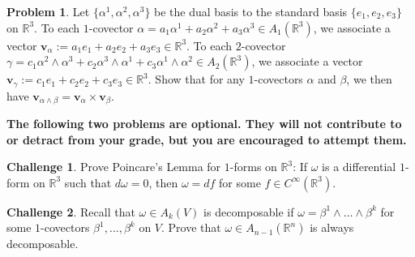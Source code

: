 \documentclass{amsart}
\newcommand{\+}[1]{\ensuremath{\mathbf{#1}}}
\newcommand{\R}{{\mathbb R}}
\theoremstyle{definition}
\newtheorem{prob}{Problem}
\newtheorem{chal}{Challenge}
\begin{document}
\begin{prob}
Let $\{\alpha^1, \alpha^2, \alpha^3\}$ be the dual basis
to the standard basis $\{e_1, e_2, e_3\}$ on $\R^3$.
To each $1$-covector $\alpha = a_1 \alpha^1 + a_2 \alpha^2 + a_3 \alpha^3
\in A_1(\R^3)$, we associate a vector $\+v_\alpha := a_1 e_1 + a_2 e_2 + a_3 e_3
\in \R^3$.
To each $2$-covector $\gamma = c_1 \alpha^2 \wedge \alpha^3 + c_2 \alpha^3 \wedge \alpha^1 + c_3 \alpha^1 \wedge \alpha^2
\in A_2(\R^3)$, we associate a vector $\+v_\gamma := c_1 e_1 + c_2 e_2 + c_3 e_3
\in \R^3$.
Show that for any $1$-covectors $\alpha$ and $\beta$, we then have
$\+v_{\alpha \wedge \beta} = \+v_\alpha \times \+v_\beta$.
\end{prob}

\vspace{5mm}

{\bf The following two problems are optional.  They
will not contribute to or detract from your grade, but you are encouraged
to attempt them.}

\vspace{5mm}

\begin{chal}
Prove Poincare's Lemma for $1$-forms on $\R^3$:
If $\omega$ is a differential $1$-form on $\R^3$ such
that $d\omega = 0$, then $\omega = df$ for some $f \in C^{\infty}(\R^3)$.
\end{chal}

\begin{chal}
Recall that $\omega \in A_k(V)$ is decomposable if
$\omega = \beta^1 \wedge \ldots \wedge \beta^k$
for some $1$-covectors $\beta^1, \ldots, \beta^k$ on $V$.
Prove that $\omega \in A_{n-1}(\R^n)$ is always decomposable.
\end{chal}
\end{document}
